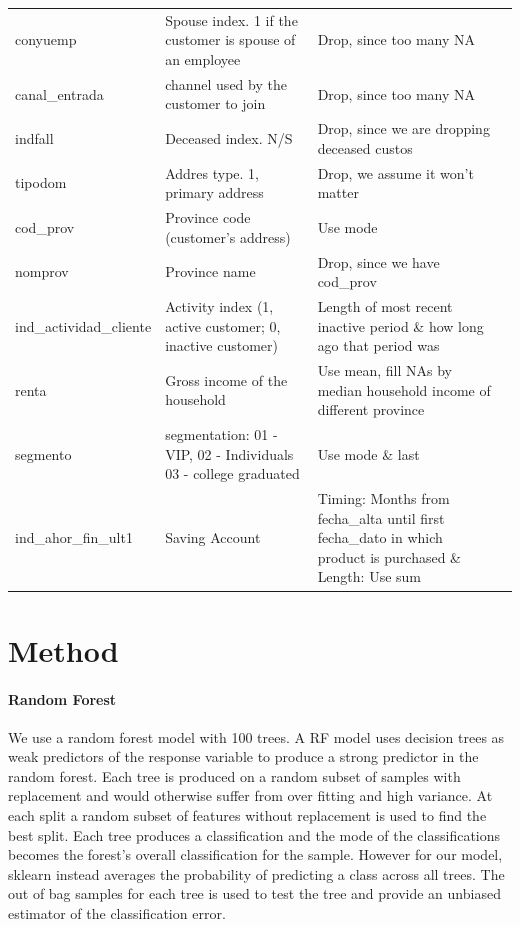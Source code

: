 \documentclass[10pt]{article}
\begin{document}
\begin{longtable}{p{3cm}p{5cm}p{5cm}p{3cm}}
conyuemp & Spouse index. 1 if the customer is spouse of an employee & Drop, since too many NA &  \\
canal\_entrada & channel used by the customer to join & Drop, since too many NA &  \\
indfall & Deceased index. N/S & Drop, since we are dropping deceased custos &  \\
tipodom & Addres type. 1, primary address & Drop, we assume it won't matter &  \\
cod\_prov & Province code (customer's address) & Use mode &  \\
nomprov & Province name & Drop, since we have cod\_prov &  \\
ind\_actividad\_cliente & Activity index (1, active customer; 0, inactive customer) & Length of most recent inactive period \& how long ago that period was &  \\
renta & Gross income of the household & Use mean, fill NAs by median household income of different province &  \\
segmento & segmentation: 01 - VIP, 02 - Individuals 03 - college graduated & Use mode \& last &  \\
ind\_ahor\_fin\_ult1 & Saving Account & Timing: Months from fecha\_alta until first fecha\_dato in which product is purchased \& Length: Use sum &  \\


\end{longtable}

\section{Method}

\paragraph{Random Forest}
We use a random forest model with 100 trees. A RF model uses decision trees as weak predictors of the response variable to produce a strong predictor in the random forest. Each tree is produced on a random subset of samples with replacement and would otherwise suffer from over fitting and high variance. At each split a random subset of features without replacement is used to find the best split. Each tree produces a classification and the mode of the classifications becomes the forest's overall classification for the sample. However for our model, sklearn instead averages the probability of predicting a class across all trees.\cite{rnSKlearn}  The out of bag samples for each tree is used to test the tree and provide an unbiased estimator of the classification error.\cite{rnLeo} 
\end{document}
